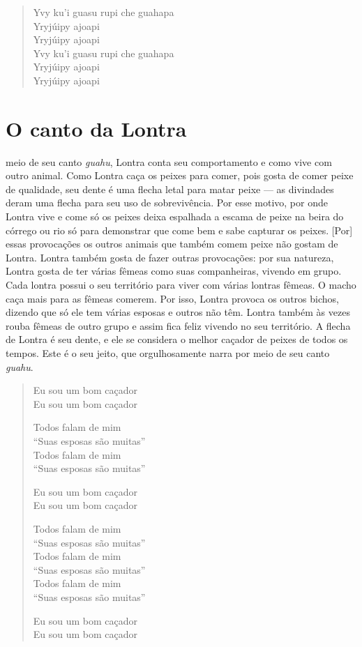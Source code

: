 \begin{verse}
Yvy ku'i guasu rupi che guahapa\\
Yryjúipy ajoapi\\
Yryjúipy ajoapi\\

Yvy ku'i guasu rupi che guahapa\\
Yryjúipy ajoapi\\
Yryjúipy ajoapi
\end{verse}

\chapter{O canto da Lontra}

 meio de seu canto \emph{guahu}, Lontra conta seu comportamento e
como vive com outro animal. Como Lontra caça os peixes para comer, pois
gosta de comer peixe de qualidade, seu dente é uma flecha letal para
matar peixe --- as divindades deram uma flecha para seu uso de
sobrevivência. Por esse motivo, por onde Lontra vive e come só os peixes
deixa espalhada a escama de peixe na beira do córrego ou rio só para
demonstrar que come bem e sabe capturar os peixes. {[}Por{]} essas
provocações os outros animais que também comem peixe não gostam de
Lontra. Lontra também gosta de fazer outras provocações: por sua
natureza, Lontra gosta de ter várias fêmeas como suas companheiras,
vivendo em grupo. Cada lontra possui o seu território para viver com
várias lontras fêmeas. O macho caça mais para as fêmeas comerem. Por
isso, Lontra provoca os outros bichos, dizendo que só ele tem várias
esposas e outros não têm. Lontra também às vezes rouba fêmeas de outro
grupo e assim fica feliz vivendo no seu território. A flecha de Lontra é
seu dente, e ele se considera o melhor caçador de peixes de todos os
tempos. Este é o seu jeito, que orgulhosamente narra por meio de seu
canto \emph{guahu}.

\begin{verse}
Eu sou um bom caçador\\
Eu sou um bom caçador

Todos falam de mim\\
``Suas esposas são muitas''\\
Todos falam de mim\\
``Suas esposas são muitas''

Eu sou um bom caçador\\
Eu sou um bom caçador

Todos falam de mim\\
``Suas esposas são muitas''\\
Todos falam de mim\\
``Suas esposas são muitas''\\
Todos falam de mim\\
``Suas esposas são muitas''

Eu sou um bom caçador\\
Eu sou um bom caçador
\end{verse}

